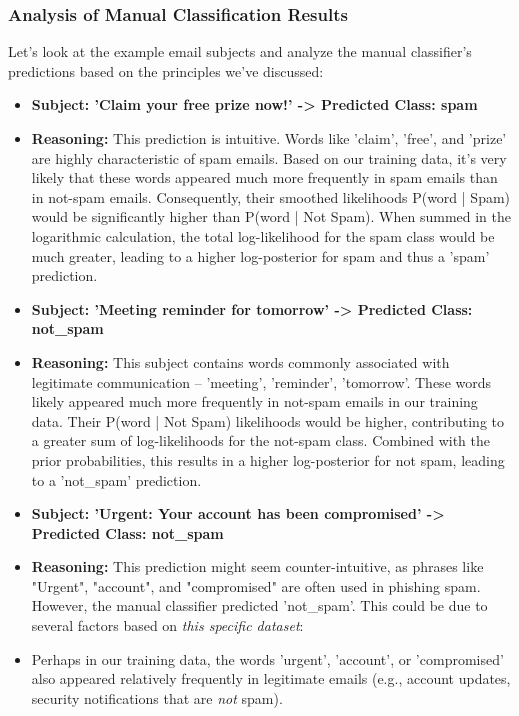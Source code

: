 \documentclass[12pt,a4paper]{article}
\begin{document}
\subsubsection{Analysis of Manual Classification Results}

Let's look at the example email subjects and analyze the manual classifier's predictions based on the principles we've discussed:

\begin{itemize}
    \item \textbf{Subject: 'Claim your free prize now!' -> Predicted Class: spam}
    \item \textbf{Reasoning:} This prediction is intuitive. Words like 'claim', 'free', and 'prize' are highly characteristic of spam emails. Based on our training data, it's very likely that these words appeared much more frequently in spam emails than in not-spam emails. Consequently, their smoothed likelihoods P(word | Spam) would be significantly higher than P(word | Not Spam). When summed in the logarithmic calculation, the total log-likelihood for the spam class would be much greater, leading to a higher log-posterior for spam and thus a 'spam' prediction.
    \item \textbf{Subject: 'Meeting reminder for tomorrow' -> Predicted Class: not\_spam}
    \item \textbf{Reasoning:} This subject contains words commonly associated with legitimate communication – 'meeting', 'reminder', 'tomorrow'. These words likely appeared much more frequently in not-spam emails in our training data. Their P(word | Not Spam) likelihoods would be higher, contributing to a greater sum of log-likelihoods for the not-spam class. Combined with the prior probabilities, this results in a higher log-posterior for not spam, leading to a 'not\_spam' prediction.
    \item \textbf{Subject: 'Urgent: Your account has been compromised' -> Predicted Class: not\_spam}
    \item \textbf{Reasoning:} This prediction might seem counter-intuitive, as phrases like "Urgent", "account", and "compromised" are often used in phishing spam. However, the manual classifier predicted 'not\_spam'. This could be due to several factors based on \textit{this specific dataset}:
    \item Perhaps in our training data, the words 'urgent', 'account', or 'compromised' also appeared relatively frequently in legitimate emails (e.g., account updates, security notifications that are \textit{not} spam).

\end{itemize}
\end{document}
